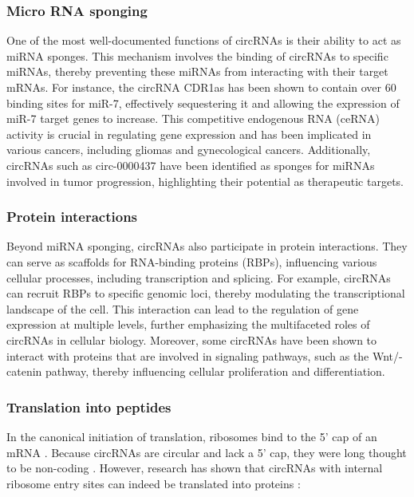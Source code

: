 \subsubsection{Micro RNA sponging}
One of the most well-documented functions of circRNAs is their ability to act as
miRNA sponges. This mechanism involves the binding of circRNAs to specific
miRNAs, thereby preventing these miRNAs from interacting with their target
mRNAs. For instance, the circRNA CDR1as has been shown to contain over 60
binding sites for miR-7, effectively sequestering it and allowing the expression
of miR-7 target genes to increase\supercite{guo_expanded_2014,yuan_regulatory_2020}. This
competitive endogenous RNA (ceRNA) activity is crucial in regulating gene
expression and has been implicated in various cancers, including gliomas and
gynecological cancers\supercite{dong_expression_2020,song_circular_2016}. Additionally,
circRNAs such as circ-0000437 have been identified as sponges for miRNAs
involved in tumor progression, highlighting their potential as therapeutic
targets\supercite{li_peptide_2021,cui_circular_2022}.

\subsubsection{Protein interactions}
Beyond miRNA sponging, circRNAs also participate in protein interactions. They
can serve as scaffolds for RNA-binding proteins (RBPs), influencing various
cellular processes, including transcription and
splicing\supercite{li_comprehensive_2017,qu_emerging_2017}. For example,
circRNAs can recruit RBPs to specific genomic loci,
thereby modulating the transcriptional landscape of the cell\supercite{li_comprehensive_2017}.
This interaction can lead to the regulation of gene expression at multiple
levels, further emphasizing the multifaceted roles of circRNAs in cellular
biology\supercite{zhang_important_2024,he_targeting_2021}. Moreover, some circRNAs have been shown
to interact with proteins that are involved in signaling pathways, such as the
Wnt/\textbeta{}-catenin pathway, thereby influencing cellular proliferation and
differentiation\supercite{peng_novel_2021}.

\subsubsection{Translation into peptides}
In the canonical initiation of translation, ribosomes bind to the 5' cap of an
mRNA \supercite{hinnebusch_mechanism_2012}. Because circRNAs are circular and
lack a 5' cap, they were long thought to be non-coding
\supercite{bao_regulatory_2019,greene_circular_2017}. However, research has
shown that circRNAs with internal ribosome entry sites can indeed be translated
into proteins \supercite{chen_expanding_2020}:

